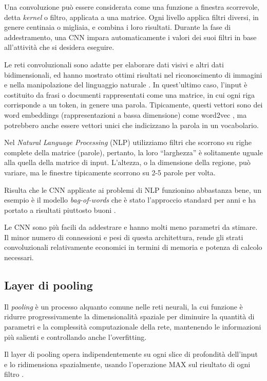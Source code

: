 Una convoluzione può essere considerata come una funzione a finestra scorrevole, detta \emph{kernel} o filtro, applicata a una matrice. 
Ogni livello applica filtri diversi, in genere centinaia o migliaia, e combina i loro risultati. 
Durante la fase di addestramento, una CNN impara automaticamente i valori dei suoi filtri in base all'attività che si desidera eseguire. 

Le reti convoluzionali sono adatte per elaborare dati visivi e altri dati bidimensionali, ed hanno mostrato ottimi risultati nel riconoscimento di immagini e nella manipolazione del linguaggio naturale \cite{manning1999foundations}.
In quest'ultimo caso, l'input è costituito da frasi o documenti rappresentati come una matrice, in cui ogni riga corrisponde a un token, in genere una parola. Tipicamente, questi vettori sono dei word embeddings (rappresentazioni a bassa dimensione) come word2vec \cite{mikolov2013distributed}, ma potrebbero anche essere vettori unici che indicizzano la parola in un vocabolario. 

Nel \emph{Natural Language Processing} (NLP) utilizziamo filtri che scorrono su righe complete della matrice (parole), pertanto, la loro ``larghezza'' è solitamente uguale alla quella della matrice di input. L'altezza, o la dimensione della regione, può variare, ma le finestre tipicamente scorrono su 2-5 parole per volta. 

Risulta che le CNN applicate ai problemi di NLP funzionino abbastanza bene, un esempio è il modello \emph{bag-of-words} che è stato l'approccio standard per anni e ha portato a risultati piuttosto buoni \cite{wallach2006topic}.

Le CNN sono più facili da addestrare e hanno molti meno parametri da stimare. 
Il minor numero di connessioni e pesi di questa architettura, rende gli strati convoluzionali relativamente economici in termini di memoria e potenza di calcolo necessari.

\subsection{Layer di pooling}
\label{subsec:maxpool}

Il \emph{pooling} è un processo alquanto comune nelle reti neurali, la cui funzione è ridurre progressivamente la dimensionalità spaziale per diminuire la quantità di parametri e la complessità computazionale della rete, mantenendo le informazioni più salienti e controllando anche l'overfitting.

Il layer di pooling opera indipendentemente su ogni slice di profondità dell'input e lo ridimensiona spazialmente, usando l'operazione MAX sul risultato di ogni filtro \cite{karpathy2016cs231n}. 

